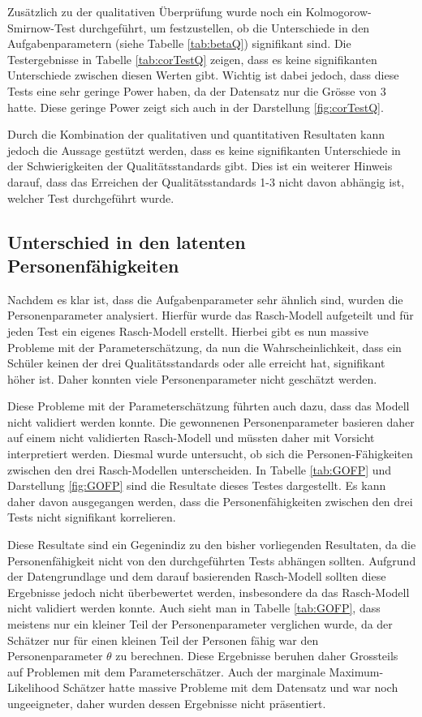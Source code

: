 Zusätzlich zu der qualitativen Überprüfung wurde noch ein Kolmogorow-Smirnow-Test durchgeführt, um festzustellen, ob die Unterschiede in den Aufgabenparametern (siehe Tabelle \ref{tab:betaQ}) signifikant sind. Die Testergebnisse in Tabelle \ref{tab:corTestQ} zeigen, dass es keine signifikanten Unterschiede zwischen diesen Werten gibt. Wichtig ist dabei jedoch, dass diese Tests eine sehr geringe Power haben, da der Datensatz nur die Grösse von 3 hatte. Diese geringe Power zeigt sich auch in der Darstellung \ref{fig:corTestQ}.


Durch die Kombination der qualitativen und quantitativen Resultaten kann jedoch die Aussage gestützt werden, dass es keine signifikanten Unterschiede in der Schwierigkeiten der Qualitätsstandards gibt. Dies ist ein weiterer Hinweis darauf, dass das Erreichen der Qualitätsstandards 1-3 nicht davon abhängig ist, welcher Test durchgeführt wurde. 

\subsection{Unterschied in den latenten Personenfähigkeiten}

Nachdem es klar ist, dass die Aufgabenparameter sehr ähnlich sind, wurden die Personenparameter analysiert. Hierfür wurde das Rasch-Modell aufgeteilt und für jeden Test ein eigenes Rasch-Modell erstellt. Hierbei gibt es nun massive Probleme mit der Parameterschätzung, da nun die Wahrscheinlichkeit, dass ein Schüler keinen der drei Qualitätsstandards oder alle erreicht hat, signifikant höher ist. Daher konnten viele Personenparameter nicht geschätzt werden.

Diese Probleme mit der Parameterschätzung führten auch dazu, dass das Modell nicht validiert werden konnte. Die gewonnenen Personenparameter basieren daher auf einem nicht validierten Rasch-Modell und müssten daher mit Vorsicht interpretiert werden. Diesmal wurde untersucht, ob sich die Personen-Fähigkeiten zwischen den drei Rasch-Modellen unterscheiden. In Tabelle \ref{tab:GOFP} und Darstellung \ref{fig:GOFP} sind die Resultate dieses Testes dargestellt. Es kann daher davon ausgegangen werden, dass die Personenfähigkeiten zwischen den drei Tests nicht signifikant korrelieren.

Diese Resultate sind ein Gegenindiz zu den bisher vorliegenden Resultaten, da die Personenfähigkeit nicht von den durchgeführten Tests abhängen sollten. Aufgrund der Datengrundlage und dem darauf basierenden Rasch-Modell sollten diese Ergebnisse jedoch nicht überbewertet werden, insbesondere da das Rasch-Modell nicht validiert werden konnte. Auch sieht man in Tabelle \ref{tab:GOFP}, dass meistens nur ein kleiner Teil der Personenparameter verglichen wurde, da der Schätzer nur für einen kleinen Teil der Personen fähig war den Personenparameter $\theta$ zu berechnen. Diese Ergebnisse beruhen daher Grossteils auf Problemen mit dem Parameterschätzer. Auch der marginale Maximum-Likelihood Schätzer hatte massive Probleme mit dem Datensatz und war noch ungeeigneter, daher wurden dessen Ergebnisse nicht präsentiert.

